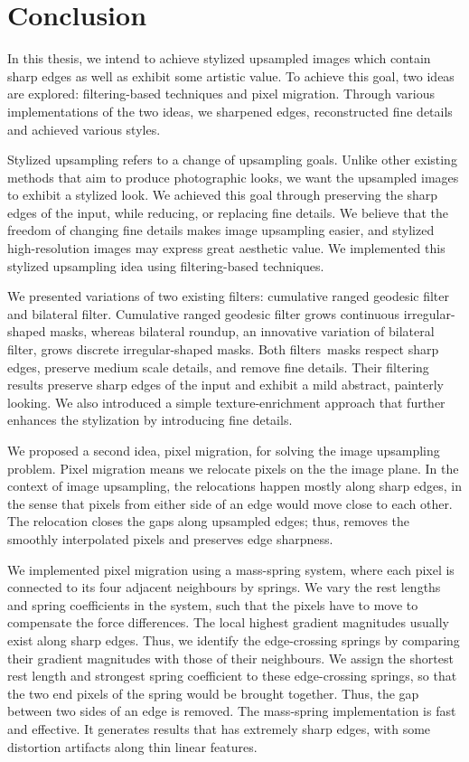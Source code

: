 \chapter{Conclusion}\label {chap:conclusion}

In this thesis, we intend to achieve stylized upsampled images which contain sharp edges as well as exhibit some artistic value. To achieve this goal, two ideas are explored: filtering-based techniques and pixel migration. Through various implementations of the two ideas, we sharpened edges, reconstructed fine details and achieved various styles.

Stylized upsampling refers to a change of upsampling goals. Unlike other existing methods that aim to produce photographic looks, we want the upsampled images to exhibit a stylized look. We achieved this goal through preserving the sharp edges of the input, while reducing, or replacing fine details. We believe that the freedom of changing fine details makes image upsampling easier, and stylized high-resolution images may express great aesthetic value. We implemented this stylized upsampling idea using filtering-based techniques.

We presented variations of two existing filters: cumulative ranged geodesic filter and bilateral filter. Cumulative ranged geodesic filter grows continuous irregular-shaped masks, whereas bilateral roundup, an innovative variation of bilateral filter, grows discrete irregular-shaped masks. Both filters\textquotesingle ~masks respect sharp edges, preserve medium scale details, and remove fine details. Their filtering results preserve sharp edges of the input and exhibit a mild abstract, painterly looking. We also introduced a simple texture-enrichment approach that further enhances the stylization by introducing fine details.

We proposed a second idea, pixel migration, for solving the image upsampling problem. Pixel migration means we relocate pixels on the the image plane. In the context of image upsampling, the relocations happen mostly along sharp edges, in the sense that pixels from either side of an edge would move close to each other. The relocation closes the gaps along upsampled edges; thus, removes the smoothly interpolated pixels and preserves edge sharpness. 

We implemented pixel migration using a mass-spring system, where each pixel is connected to its four adjacent neighbours by springs. We vary the rest lengths and spring coefficients in the system, such that the pixels have to move to compensate the force differences. The local highest gradient magnitudes usually exist along sharp edges. Thus, we identify the edge-crossing springs by comparing their gradient magnitudes with those of their neighbours. We assign the shortest rest length and strongest spring coefficient to these edge-crossing springs, so that the two end pixels of the spring would be brought together. Thus, the gap between two sides of an edge is removed. The mass-spring implementation is fast and effective. It generates results that has extremely sharp edges, with some distortion artifacts along thin linear features.

